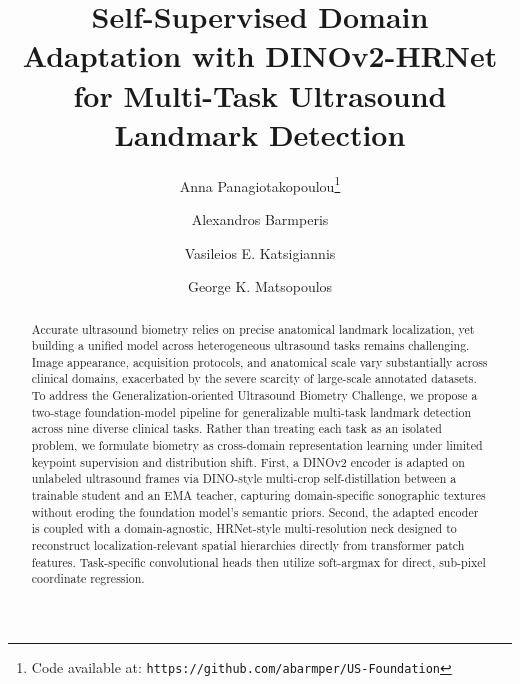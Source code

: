 \documentclass[runningheads]{llncs}
\begin{document}
\title{Self-Supervised Domain Adaptation with DINOv2-HRNet for Multi-Task Ultrasound Landmark Detection}

\author{Anna Panagiotakopoulou\thanks{Code available at: \texttt{https://github.com/abarmper/US-Foundation}} \and
Alexandros Barmperis \and
Vasileios E. Katsigiannis \and
George K. Matsopoulos}


\institute{Biomedical Engineering Laboratory, School of Electrical and Computer Engineering, \\
National Technical University of Athens, Athens, Greece\\
\email{annapan@biomed.ntua.gr, amparmperis@biomed.ntua.gr,
vassiliskat@biomed.ntua.gr, gmatsopoulos@biomed.ntua.gr} \and
Archimedes Research Unit, Athena Research Center, Athens, Greece}

\maketitle

\begin{abstract}
Accurate ultrasound biometry relies on precise anatomical landmark localization, yet building a unified model across heterogeneous ultrasound tasks remains challenging. Image appearance, acquisition protocols, and anatomical scale vary substantially across clinical domains, exacerbated by the severe scarcity of large-scale annotated datasets. To address the Generalization-oriented Ultrasound Biometry Challenge, we propose a two-stage foundation-model pipeline for generalizable multi-task landmark detection across nine diverse clinical tasks. Rather than treating each task as an isolated problem, we formulate biometry as cross-domain representation learning under limited keypoint supervision and distribution shift. First, a DINOv2 encoder is adapted on unlabeled ultrasound frames via DINO-style multi-crop self-distillation between a trainable student and an EMA teacher, capturing domain-specific sonographic textures without eroding the foundation model's semantic priors. Second, the adapted encoder is coupled with a domain-agnostic, HRNet-style multi-resolution neck designed to reconstruct localization-relevant spatial hierarchies directly from transformer patch features. Task-specific convolutional heads then utilize soft-argmax for direct, sub-pixel coordinate regression.

\end{abstract}
\end{document}
